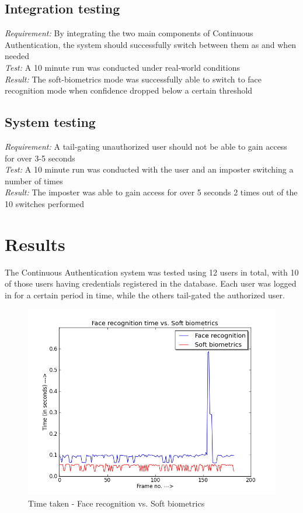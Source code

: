 \documentclass[12pt]{article}			%
\begin{document}
\subsection{ Integration testing}
\emph{ Requirement: } By integrating the two main components of Continuous Authentication, the system should successfully switch between them as and when needed\\
\emph{ Test: } A 10 minute run was conducted under real-world conditions\\
\emph{ Result: } The soft-biometrics mode was successfully able to switch to face recognition mode when confidence dropped below a certain threshold\\

\subsection{ System testing }
\emph{ Requirement: } A tail-gating unauthorized user should not be able to gain access for over 3-5 seconds\\
\emph{ Test: } A 10 minute run was conducted with the user and an imposter switching a number of times\\
\emph{ Result: } The imposter was able to gain access for over 5 seconds 2 times out of the 10 switches performed\\

\section{ Results }
The Continuous Authentication system was tested using 12 users in total, with 10 of those users having credentials registered in the database. Each user was logged in for a certain period in time, while the others tail-gated the authorized user. 

\begin{figure}
	\caption{Time taken - Face recognition vs. Soft biometrics}
	\centering
		\includegraphics[scale=0.6]{img/face_vs_soft.png}
\end{figure}
\end{document}
